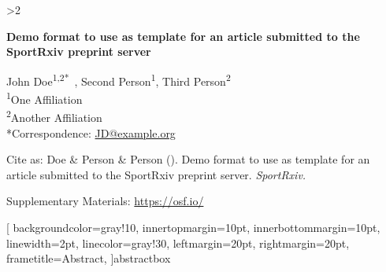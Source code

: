 \documentclass[
]{article}
\author{John Doe \and Second Person \and Third Person}
\date{}
\newcommand\shortauthor{}
\begin{document}
\ifnum\thenauthor>2
\renewcommand{\shortauthor}{John Doe et al. }
\else 
\renewcommand{\shortauthor}{Doe \& Person \& Person }
\fi

\pagestyle{fancy}
\fancyhead[L]{\shortauthor(\the\year)}
\fancyhead[R]{}
\begin{flushleft}
\begin{spacing}{2.5}
\thispagestyle{firstpage}
\vspace*{0.1cm}
{\huge{\textbf{Demo format to use as template for an article submitted
to the SportRxiv preprint server}}}
\end{spacing}
\vspace*{0.1cm}
John Doe\textsuperscript{1,2*}~, Second
Person\textsuperscript{1}, Third Person\textsuperscript{2}
\\
\bigskip
\textsuperscript{1}One Affiliation\\ \textsuperscript{2}Another
Affiliation
\\
\bigskip
*Correspondence: 
\href{mailto:JD@example.org}{\color{black}JD@example.org}
\\
\bigskip
\begin{spacing}{1}
Cite as: \shortauthor(\the\year). Demo format to use as template for an
article submitted to the SportRxiv preprint server. \emph{SportRxiv.} \\
\end{spacing}
  \vspace{1mm} Supplementary Materials: \href{https://osf.io/}{https://osf.io/} \\
\vspace*{1cm}
\end{flushleft}


\newenvironment{abstractbox}
  {}

\surroundwithmdframed[
  backgroundcolor=gray!10,
  innertopmargin=10pt,
  innerbottommargin=10pt,
  linewidth=2pt,
  linecolor=gray!30,
  leftmargin=20pt,
  rightmargin=20pt,
  frametitle={\large{Abstract}},
]{abstractbox}
\end{document}
